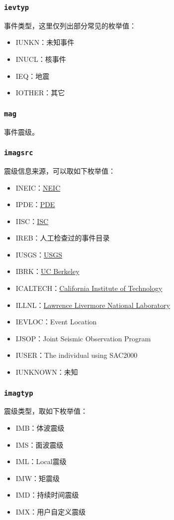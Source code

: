 \subsubsection{\texttt{ievtyp}}
事件类型，这里仅列出部分常见的枚举值：
\begin{itemize}
\ttfamily
\item IUNKN：未知事件
\item INUCL：核事件
\item IEQ：地震
\item IOTHER：其它
\end{itemize}

\subsubsection{\texttt{mag}}
事件震级。

\subsubsection{\texttt{imagsrc}}
震级信息来源，可以取如下枚举值：
\begin{itemize}
\ttfamily
\item INEIC：\href{http://earthquake.usgs.gov/regional/neic/}{NEIC}
\item IPDE：\href{http://earthquake.usgs.gov/data/pde.php}{PDE}
\item IISC：\href{http://www.isc.ac.uk/}{ISC}
\item IREB：人工检查过的事件目录
\item IUSGS：\href{http://earthquake.usgs.gov}{USGS}
\item IBRK：\href{http://seismo.berkeley.edu/}{UC Berkeley}
\item ICALTECH：\href{http://www.seismolab.caltech.edu}{California Institute of Technology}
\item ILLNL：\href{https://www.llnl.gov/}{Lawrence Livermore National Laboratory}
\item IEVLOC：Event Location
\item IJSOP：Joint Seismic Observation Program
\item IUSER：The individual using SAC2000
\item IUNKNOWN：未知
\end{itemize}

\subsubsection{\texttt{imagtyp}}
震级类型，取如下枚举值：
\begin{itemize}
\ttfamily
\item IMB：体波震级
\item IMS：面波震级
\item IML：Local震级
\item IMW：矩震级
\item IMD：持续时间震级
\item IMX：用户自定义震级
\end{itemize}

